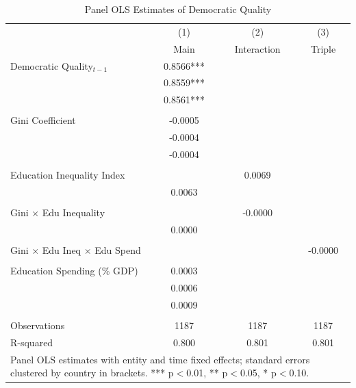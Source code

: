 \begin{table}[htbp]
\centering
\caption{Panel OLS Estimates of Democratic Quality}
\label{tab:dual_stratification}
\begin{tabular}{lccc}
\hline
 & (1) & (2) & (3) \\
 & Main & Interaction & Triple \\
\hline
Democratic Quality$_{t-1}$  & 0.8566*** \\ [0.0482]  & 0.8559*** \\ [0.0485]  & 0.8561*** \\ [0.0484] \\
Gini Coefficient  & -0.0005 \\ [0.0004]  & -0.0004 \\ [0.0005]  & -0.0004 \\ [0.0006] \\
Education Inequality Index  &  & 0.0069 \\ [0.0090]  & 0.0063 \\ [0.0088] \\
Gini $\times$ Edu Inequality  &  & -0.0000 \\ [0.0002]  & 0.0000 \\ [0.0002] \\
Gini $\times$ Edu Ineq $\times$ Edu Spend  &  &  & -0.0000 \\ [0.0000] \\
Education Spending (\% GDP)  & 0.0003 \\ [0.0008]  & 0.0006 \\ [0.0008]  & 0.0009 \\ [0.0008] \\
\hline
\hline
Observations  & 1187 
 & 1187 
 & 1187 \\
R-squared  & 0.800 
 & 0.801 
 & 0.801 \\
\hline
\multicolumn{4}{p{\linewidth}}{\footnotesize Panel OLS estimates with entity and time fixed effects; standard errors clustered by country in brackets. *** p$<$0.01, ** p$<$0.05, * p$<$0.10.}
\end{tabular}
\end{table}